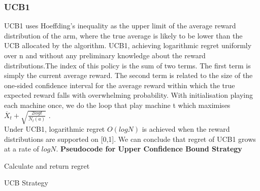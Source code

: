 \subsubsection{UCB1}
UCB1 uses Hoeffding's inequality as the upper limit of the average reward distribution of the arm, where the true average is likely to be lower than the UCB allocated by the algorithm.
UCB1, achieving logarithmic regret uniformly over n and without any preliminary knowledge about the reward distributions.The index of this policy is the sum of two terms. The first term is simply the current average reward. The second term is related to the size of the one-sided confidence interval for the average reward within which the true expected reward falls with overwhelming probability. With initialisation playing each machine once, we do the loop that play machine t which maximises $\overline X_t  + \sqrt{\frac{2log t}{N_t (a)}}$ . \citep{Auer2002}
\\Under UCB1, logarithmic regret $O(logN)$  is achieved when the reward distributions are supported on [0,1].  \citep{Chan_2020} We can conclude that regret of UCB1 grows at a rate of $log N$.
\newline
\textbf{Pseudocode for Upper Confidence Bound Strategy}
\newline
\begin{algorithm}[H]
 Calculate and return regret
 \caption{UCB Strategy}
\end{algorithm}

